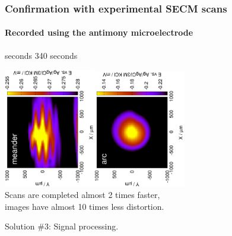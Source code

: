 \documentclass{beamer}
\begin{document}


\begin{frame}
	\centering
	\frametitle{Confirmation with experimental SECM scans}
	\framesubtitle{Recorded using the antimony microelectrode}
	\quad\quad\quad\quad{} seconds \hfill 340 seconds \quad\quad\quad\quad\quad\quad


	\includegraphics[width=0.3\textwidth, angle=-90]{meander.eps}\includegraphics[width=0.3\textwidth, angle=-90]{arc.eps}\\
	\vfill
	Scans are completed almost 2 times faster,\\ images have almost 10 times less distortion.
\end{frame}

\begin{frame}[plain]
\centering
Solution \#3: Signal processing.
\end{frame}
\end{document}
